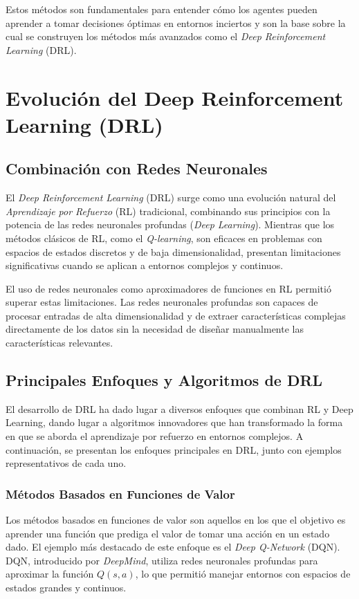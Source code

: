 \documentclass[a4paper,12pt, twoside]{report}
\begin{document}
Estos métodos son fundamentales para entender cómo los agentes pueden aprender a tomar decisiones 
óptimas en entornos inciertos y son la base sobre la cual se construyen los métodos más avanzados 
como el \textit{Deep Reinforcement Learning} (DRL).


\section{Evolución del Deep Reinforcement Learning (DRL)}

\subsection{Combinación con Redes Neuronales}

El \textit{Deep Reinforcement Learning} (DRL) surge como una evolución natural del 
\textit{Aprendizaje por Refuerzo} (RL) tradicional, combinando sus principios con la potencia 
de las redes neuronales profundas (\textit{Deep Learning}). Mientras que los métodos clásicos 
de RL, como el \textit{Q-learning}, son eficaces en problemas con espacios de estados discretos 
y de baja dimensionalidad, presentan limitaciones significativas cuando se aplican a entornos 
complejos y continuos.

El uso de redes neuronales como aproximadores de funciones en RL permitió superar estas 
limitaciones. Las redes neuronales profundas son capaces de procesar entradas de alta 
dimensionalidad y de extraer características complejas directamente de los datos sin la necesidad 
de diseñar manualmente las características relevantes. 

\subsection{Principales Enfoques y Algoritmos de DRL}

El desarrollo de DRL ha dado lugar a diversos enfoques que combinan RL y Deep Learning, dando 
lugar a algoritmos innovadores que han transformado la forma en que se aborda el aprendizaje 
por refuerzo en entornos complejos. A continuación, se presentan los enfoques principales en 
DRL, junto con ejemplos representativos de cada uno.

\subsubsection{Métodos Basados en Funciones de Valor}

Los métodos basados en funciones de valor son aquellos en los que el objetivo es aprender 
una función que prediga el valor de tomar una acción en un estado dado. El ejemplo más 
destacado de este enfoque es el \textit{Deep Q-Network} (DQN). DQN, introducido por 
\textit{DeepMind}, utiliza redes neuronales profundas para aproximar la función \(Q(s, a)\), 
lo que permitió manejar entornos con espacios de estados grandes y continuos.
\end{document}
